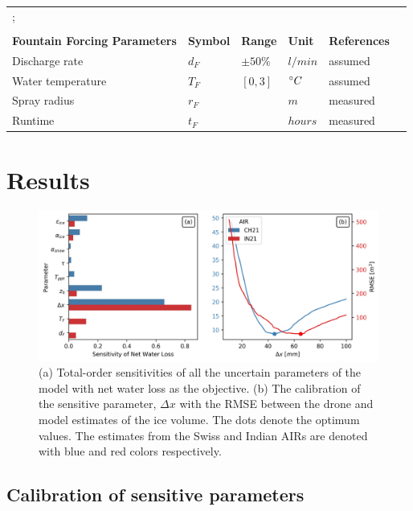 \documentclass[utf8]{frontiersSCNS}
\begin{document}
\begin{table}[h!]
\begin{tabular}{@{}llllll@{}}
    \citeauthor{Schmidt_2017};      \\
    & &    &  & \citeauthor{OerlemansKnap_1998}      \\\midrule
		\textbf{Fountain Forcing Parameters} & \textbf{Symbol} & \textbf{Range} & \textbf{Unit} & \textbf{References} \\\midrule
    Discharge rate & $d_{F}$             & $\pm 50 \%$            & $l/min$& assumed  \\
    Water temperature & $T_{F}$             & $[0,3]$            & $\degree C$  & assumed  \\
    Spray radius & $r_{F}$             &             & $m$& measured \\
    Runtime & $t_{F}$             &             &  $hours$ & measured \\\bottomrule
	\end{tabular}
\end{table}

\section{Results}

\begin{figure}
	\begin{center}
		\includegraphics[width=\linewidth]{Figures/Figure_5.jpg}
	\end{center}
  \caption{(a) Total-order sensitivities of all the uncertain parameters of the model with net water loss as the
  objective. (b) The calibration of the sensitive parameter, $\Delta x$ with the RMSE between the drone and
model estimates of the ice volume. The dots denote the optimum values. The estimates from the Swiss and Indian
AIRs are denoted with blue and red colors respectively. }

	\label{fig:param_hist}
\end{figure}


\subsection{Calibration of sensitive parameters}
\end{document}

